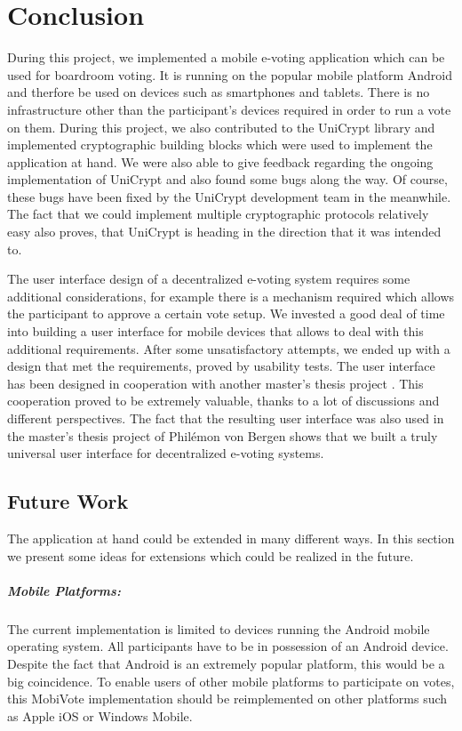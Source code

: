 \documentclass[numbers=noenddot, abstract=on, a4paper, headsepline,
footsepline, oneside, draft=off]{scrreprt}
\begin{document}
\chapter{Conclusion}
\label{cha:conclusion}
During this project, we implemented a mobile e-voting application which can be
used for boardroom voting. It is running on the popular mobile platform
Android and therfore be used on devices such as smartphones and tablets. There
is no infrastructure other than the participant's devices required in order to
run a vote on them. During this project, we also contributed to the UniCrypt
library and implemented cryptographic building blocks which were used to
implement the application at hand. We were also able to give feedback regarding
the ongoing implementation of UniCrypt and also found some bugs along the way.
Of course, these bugs have been fixed by the UniCrypt development team in the
meanwhile. The fact that we could implement multiple cryptographic protocols
relatively easy also proves, that UniCrypt is heading in the direction that it
was intended to. 

The user interface design of a decentralized e-voting system requires some
additional considerations, for example there is a mechanism required which
allows the participant to approve a certain vote setup. We invested a good deal
of time into building a user interface for mobile devices that allows to deal
with this additional requirements. After some unsatisfactory attempts, we ended
up with a design that met the requirements, proved by usability tests. The user
interface has been designed in cooperation with another master's thesis project
\cite{vonBergen14}. This cooperation proved to be extremely valuable, thanks to
a lot of discussions and different perspectives. The fact that the resulting
user interface was also used in the master's thesis project of Philémon von
Bergen shows that we built a truly universal user interface for decentralized
e-voting systems.

\section{Future Work}
\label{sec:futurework}
The application at hand could be extended in many different ways. In this
section we present some ideas for extensions which could be realized in the future.

\paragraph{Mobile Platforms:} The current implementation is limited to devices
running the Android mobile operating system. All participants have to be in
possession of an Android device. Despite the fact that Android is an extremely
popular platform, this would be a big coincidence. To enable users of other
mobile platforms to participate on votes, this MobiVote implementation should be
reimplemented on other platforms such as Apple iOS or Windows Mobile.
\end{document}
